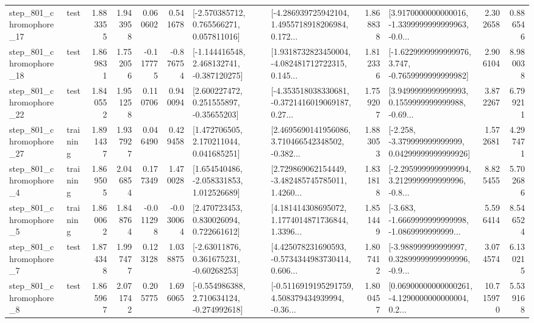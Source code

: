 \begin{tabular}{llrrrrllrlrr}
  step\_801\_chromophore\_17 &      test &      1.883355 &    1.943958 &      0.060602 &  0.541678 &    [-2.570385712, 0.765566271, 0.057811016] &  [-4.286939725942104, 1.4955718918206984, 0.172... &       1.868838 &  [3.9170000000000016, -1.3399999999999963, -0.0... &            2.302658 &          0.886546 \\
  step\_801\_chromophore\_18 &      test &      1.869831 &    1.752056 &     -0.117775 & -0.876754 &   [-1.144416548, 2.468132741, -0.387120275] &  [1.9318732823450004, -4.082481712722315, 0.145... &       1.812336 &  [-1.6229999999999976, 3.747, -0.7659999999999982] &            2.906104 &          8.980038 \\
  step\_801\_chromophore\_22 &      test &      1.840552 &    1.951258 &      0.110706 &  0.940094 &     [2.600227472, 0.251555897, -0.35655203] &  [-4.353518038330681, -0.3721416019069187, 0.27... &       1.759207 &  [3.9499999999999993, 0.1559999999999988, -0.69... &            3.872267 &          6.799211 \\
  step\_801\_chromophore\_27 &  training &      1.891437 &    1.937927 &      0.046490 &  0.429458 &     [1.472706505, 2.170211044, 0.041685251] &  [2.4695690141956086, 3.710466542348502, -0.382... &       1.883053 &  [-2.258, -3.379999999999999, 0.04299999999999926] &            1.572681 &          4.297471 \\
   step\_801\_chromophore\_4 &  training &      1.869505 &    2.046854 &      0.177349 &  1.470028 &    [1.654540486, -2.058331853, 1.012526689] &  [2.729869062154449, -3.482485745785011, 1.4260... &       1.831818 &  [-2.2959999999999994, 3.2129999999999996, -0.8... &            8.825455 &          5.702686 \\
   step\_801\_chromophore\_5 &  training &      1.860062 &    1.848764 &     -0.011298 & -0.030064 &     [2.470723453, 0.830026094, 0.722661612] &  [4.181414308695072, 1.1774014871736844, 1.3396... &       1.851449 &  [-3.683, -1.6669999999999998, -1.0869999999999... &            5.596414 &          8.546524 \\
   step\_801\_chromophore\_7 &      test &      1.874348 &    1.997477 &      0.123128 &  1.038875 &     [-2.63011876, 0.361675231, -0.60268253] &  [4.425078231690593, -0.5734344983730414, 0.606... &       1.807412 &  [-3.988999999999997, 0.32899999999999996, -0.9... &            3.074574 &          6.130215 \\
   step\_801\_chromophore\_8 &      test &      1.865967 &    2.071742 &      0.205775 &  1.696065 &   [-0.554986388, 2.710634124, -0.274992618] &  [-0.5116919195291759, 4.508379434939994, -0.36... &       1.800457 &  [0.06900000000000261, -4.1290000000000004, 0.2... &           10.715970 &          5.539168 \\

\end{tabular}
